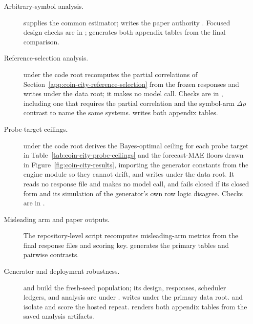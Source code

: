 \begin{description}
  \item[Arbitrary-symbol analysis.]
   supplies the common estimator;
  writes the paper authority
  . Focused design
  checks are in ;
   generates both appendix
  tables from the final comparison.

  \item[Reference-selection analysis.]
   under the code root
  recomputes the partial correlations of
  Section~\ref{app:coin-city-reference-selection} from the frozen responses and
  writes  under the data root; it
  makes no model call. Checks are in
  , including one that requires
  the partial correlation and the symbol-arm $\Delta\rho$ contrast to name the same
  systems.  writes
  both appendix tables.

  \item[Probe-target ceilings.]
   under the code root derives the
  Bayes-optimal ceiling for each probe target in
  Table~\ref{tab:coin-city-probe-ceilings} and the forecast-MAE floors drawn in
  Figure~\ref{fig:coin-city-results}, importing the generator constants from
  the engine module so they cannot drift, and writes
   under the data root. It reads no
  response file and makes no model call, and fails closed if its closed form and
  its simulation of the generator's own row logic disagree. Checks are in
  .

  \item[Misleading arm and paper outputs.]
  The repository-level script
   recomputes misleading-arm
  metrics from the final response files and scoring key.
   generates the primary tables
  and pairwise contrasts.

  \item[Generator and deployment robustness.]
   and
   build the fresh-seed
  population; its design, responses, scheduler ledgers, and analysis are
  under .
   writes
   under the primary data root.
   and
   isolate and score the
  hosted repeat.  renders
  both appendix tables from the saved analysis artifacts.
\end{description}
